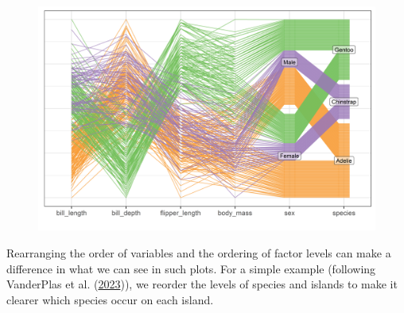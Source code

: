 \documentclass[
  letterpaper,
  10pt,
  krantz2]{krantz}
\begin{document}
\begin{figure}

{\centering \includegraphics[width=18in,height=\textheight]{figs/fig-peng-ggpcp1-1.png}

}

\end{figure}

Rearranging the order of variables and the ordering of factor levels can
make a difference in what we can see in such plots. For a simple example
(following VanderPlas et al.
(\protect\hyperlink{ref-VanderPlas2023}{2023})), we reorder the levels
of species and islands to make it clearer which species occur on each
island.
\end{document}
